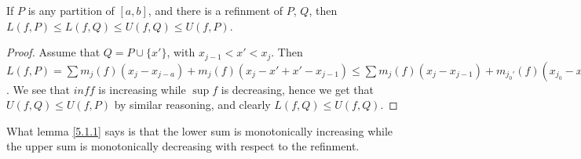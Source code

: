 \begin{lemma}\label{5.1.1}
    If $P$ is any partition of  $[a,b]$, and there is a refinment of $P$, $Q$, then $L(f,P) \leq L(f,Q) \leq U(f,Q) \leq U(f,P)$. 
\end{lemma}
\begin{proof}
    Assume that $Q=P \cup \{x'\}$, with $x_{j-1}<x'<x_j$.
    Then $L(f,P)=\sum{m_j(f)(x_j-x_{j-a})}+m_j(f)(x_j-x'+x'-x_{j-1}) \leq \sum{m_j(f)(x_j-x_{j-1})}+m_{j_0'}(f)(x_{j_0}-x')+m_{j_0''}(f)(x'-x_j_0)=L(f,Q)$. We see that $inf{f}$ is increasing while $\sup{f}$ is decreasing, hence we get that  $U(f,Q) \leq U(f,P)$ by similar reasoning, and clearly  $L(f,Q) \leq U(f,Q)$.
\end{proof}
\begin{remark}
    What lemma \ref{5.1.1} says is that the lower sum is monotonically increasing while the upper sum is monotonically decreasing with respect to the refinment.
\end{remark}
